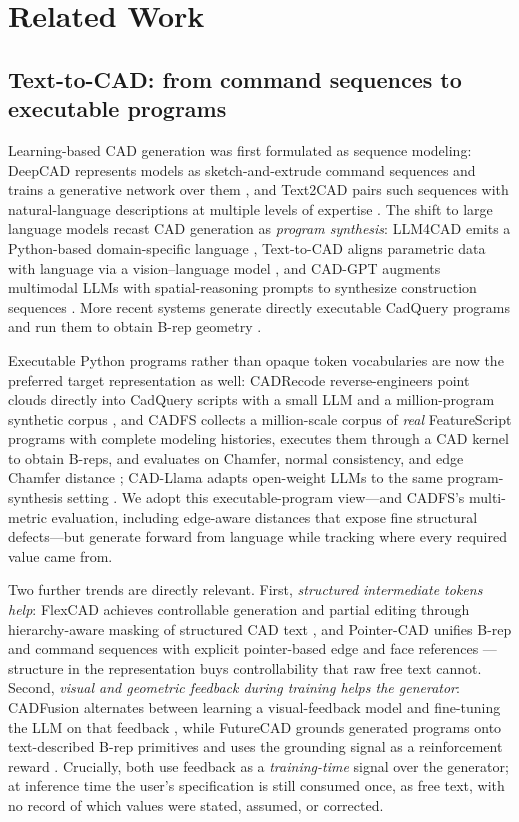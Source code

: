 \section{Related Work}\label{sec:related}

\subsection{Text-to-CAD: from command sequences to executable programs}
\label{sec:related:t2c}

Learning-based CAD generation was first formulated as sequence modeling:
DeepCAD represents models as sketch-and-extrude command sequences and trains
a generative network over them \cite{deepcad}, and Text2CAD pairs such
sequences with natural-language descriptions at multiple levels of expertise
\cite{text2cad}. The shift to large language models recast CAD generation as
\emph{program synthesis}: LLM4CAD emits a Python-based domain-specific
language \cite{llm4cad}, Text-to-CAD aligns parametric data with language via
a vision--language model \cite{texttocad_vl}, and CAD-GPT augments multimodal
LLMs with spatial-reasoning prompts to synthesize construction sequences
\cite{cadgpt}. More recent systems generate directly executable CadQuery
programs and run them to obtain B-rep geometry \cite{procad,cadrille}.

Executable Python programs rather than opaque token vocabularies are now the
preferred target representation as well: CADRecode reverse-engineers point
clouds directly into CadQuery scripts with a small LLM and a
million-program synthetic corpus \cite{cadrecode}, and CADFS collects a
million-scale corpus of \emph{real} FeatureScript programs with complete
modeling histories, executes them through a CAD kernel to obtain B-reps, and
evaluates on Chamfer, normal consistency, and edge Chamfer distance
\cite{cadfs}; CAD-Llama adapts open-weight LLMs to the same
program-synthesis setting \cite{cadllama}. We adopt this executable-program
view---and CADFS's multi-metric evaluation, including edge-aware distances
that expose fine structural defects---but generate forward from language
while tracking where every required value came from.

Two further trends are directly relevant. First, \emph{structured
intermediate tokens help}: FlexCAD achieves controllable generation and
partial editing through hierarchy-aware masking of structured CAD text
\cite{flexcad}, and Pointer-CAD unifies B-rep and command sequences with
explicit pointer-based edge and face references \cite{pointercad}---structure
in the representation buys controllability that raw free text cannot. Second,
\emph{visual and geometric feedback during training helps the generator}:
CADFusion alternates between learning a visual-feedback model and fine-tuning
the LLM on that feedback \cite{cadfusion}, while FutureCAD grounds generated
programs onto text-described B-rep primitives and uses the grounding signal as
a reinforcement reward \cite{futurecad}. Crucially, both use feedback as a
\emph{training-time} signal over the generator; at inference time the user's
specification is still consumed once, as free text, with no record of which
values were stated, assumed, or corrected.

